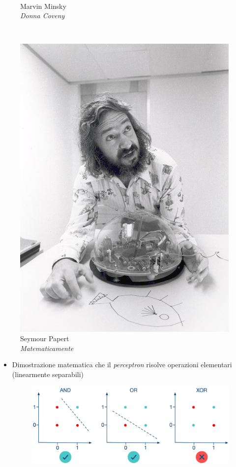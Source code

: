 \begin{frame}[t,fragile]
{{\begin{minipage}[t]{\textwidth}
\begin{minipage}[t]{0.3\textwidth}
\begin{minipage}[t]{\textwidth}
\begin{figure}[ht]
					{\tiny\\Marvin Minsky\\\vspace*{-4pt}\textit{\textcopyright Donna Coveny}}
				\end{figure}
			\end{minipage}
			\\
			\begin{minipage}[t]{\textwidth}
				\begin{figure}[ht]
					\includegraphics[width=.45\textwidth]{img/Seymour_Papert.jpg}
					{\tiny\\Seymour Papert\\\vspace*{-4pt}\textit{\textcopyright Matematicamente}}
				\end{figure}
			\end{minipage}
		\end{minipage}
		\hfill
		\begin{minipage}[t]{0.65\textwidth}
			\begin{itemize}[leftmargin=0pt,align=right]
			\item[\alert{\faHandORight}] Dimostrazione matematica che il \textit{perceptron} risolve operazioni elementari (\alert{linearmente separabili})
			\begin{figure}[ht]
				\includegraphics[width=\textwidth]{img/AND-OR-XOR-0.png}

\end{figure}
\end{itemize}
\end{minipage}
\end{minipage}}}
\end{frame}
